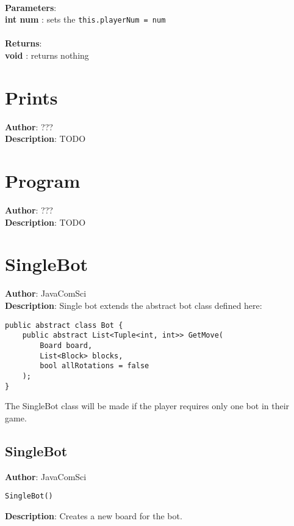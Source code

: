 \documentclass[12pt]{article}
\begin{document}
\textbf{\large{\\Parameters}}:\\
\textbf{int num }: sets the \texttt{this.playerNum = num}\\\textbf{\large{\\Returns}}:\\
\textbf{void }: returns nothing\\

\section{Prints}
\textbf{Author}: ??? \\
\textbf{Description}: TODO \\



\section{Program}
\textbf{Author}: ??? \\
\textbf{Description}: TODO \\



\section{SingleBot}
\textbf{Author}: JavaComSci \\
\textbf{Description}: Single bot extends the abstract bot class defined here: 
\begin{verbatim}
public abstract class Bot {
    public abstract List<Tuple<int, int>> GetMove(
        Board board, 
        List<Block> blocks, 
        bool allRotations = false
    );
}
\end{verbatim}
 The SingleBot class will be made if the player requires only one bot in their game. \\



\subsection{SingleBot}
\textbf{Author}: JavaComSci 
\vspace*{1\baselineskip}
\begin{lstlisting}
SingleBot()
\end{lstlisting} 
\vspace*{1\baselineskip}
\textbf{Description}: Creates a new board for the bot. 
\end{document}
